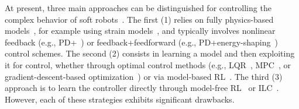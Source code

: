 At present, three main approaches can be distinguished for controlling the complex behavior of soft robots~\cite{thuruthel2018control, della2023model}. The first (1) relies on fully physics-based models~\cite{armanini2023soft}, for example using strain models~\cite{alessi2024rod}, and typically involves nonlinear feedback (e.g., PD+~\cite{della2020model}) or feedback+feedforward (e.g., PD+energy-shaping~\cite{della2023model, caasenbrood2023control}) control schemes. The second (2) consists in learning a model and then exploiting it for control, whether through optimal control methods (e.g., \gls{LQR}~\cite{bruder2020data, haggerty2023control}, \gls{MPC}~\cite{gillespie2018learning, thuruthel2017learning, alora2023robust, alora2023data}, or gradient-descent-based optimization~\cite{bern2020soft, marques2024visuo}) or via model-based \gls{RL}~\cite{thuruthel2018model, centurelli2022closed}. The third (3) approach is to learn the controller directly through model-free \gls{RL}~\cite{morimoto2021model, jitosho2023reinforcement, alessi2024pushing} or \gls{ILC}~\cite{hofer2019iterative, pierallini2023provably}. However, each of these strategies exhibits significant drawbacks.

